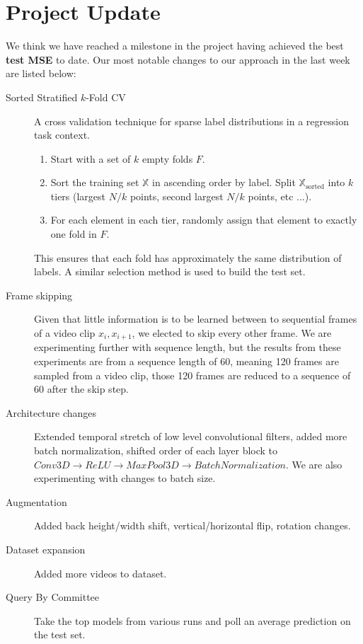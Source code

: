 \documentclass{article}
\begin{document}
\section*{Project Update}
We think we have reached a milestone in the project having achieved the best \textbf{test MSE} to date.
Our most notable changes to our approach in the last week are listed below:
\begin{description}
    \item[Sorted Stratified $k$-Fold CV] A cross validation technique for sparse label distributions in a regression task context. 
        \begin{enumerate}
            \item Start with a set of $k$ empty folds $F$.
            \item Sort the training set $\mathbb{X}$ in ascending order by label. Split $\mathbb{X}_{\mathrm{sorted}}$ into $k$ tiers (largest $N/k$ points, second largest $N/k$ points, etc ...). 
            \item For each element in each tier, randomly assign that element to exactly one fold in $F$.
        \end{enumerate}

        This ensures that each fold has approximately the same distribution of labels.
        A similar selection method is used to build the test set. 

    \item[Frame skipping] Given that little information is to be learned between to sequential frames of a video clip $x_{i}, x_{i+1}$, we elected to skip every other frame. We are experimenting further with sequence length, but the results from these experiments are from a sequence length of $60$, meaning 120 frames are sampled from a video clip, those 120 frames are reduced to a sequence of 60 after the skip step.

    \item[Architecture changes] Extended temporal stretch of low level convolutional filters, added more batch normalization, shifted order of each layer block to $Conv3D \rightarrow ReLU \rightarrow MaxPool3D \rightarrow BatchNormalization$. We are also experimenting with changes to batch size.
    \item[Augmentation] Added back height/width shift, vertical/horizontal flip, rotation changes. 
    \item[Dataset expansion] Added more videos to dataset.
    \item[Query By Committee] Take the top models from various runs and poll an average prediction on the test set. 
\end{description}
\end{document}
